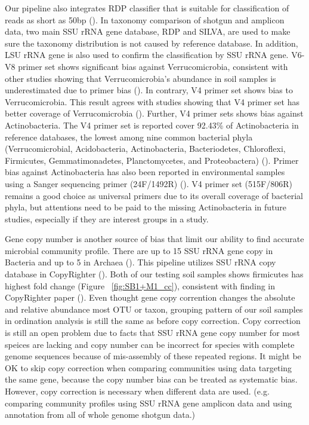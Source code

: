 \documentclass[12pt]{article}
\begin{document}
  Our pipeline also integrates RDP classifier that is suitable for classification of reads as short as 50bp (\cite{rdpclassifier}). In taxonomy comparison of shotgun and amplicon data, two main SSU rRNA gene database, RDP and SILVA, are used to make sure the taxonomy distribution is not caused by reference database. In addition, LSU rRNA gene is also used to confirm the classification by SSU rRNA gene. V6-V8 primer set shows significant bias against Verrucomicrobia, consistent with other studies showing that Verrucomicrobia’s abundance in soil samples is underestimated due to primer bias (\cite{verruco2011}). In contrary, V4 primer set shows bias to Verrucomicrobia. This result agrees with studies showing that V4 primer set has better coverage of Verrucomicrobia (\cite{verruco2011}). Further, V4 primer sets shows bias against Actinobacteria. The V4 primer set is reported cover 92.43\% of Actinobacteria in reference databases, the lowest among nine common bacterial phyla (Verrucomicrobial, Acidobacteria, Actinobacteria, Bacteriodetes, Chloroflexi, Firmicutes, Gemmatimonadetes, Planctomycetes, and Proteobactera) (\cite{verruco2011}). Primer bias against Actinobacteria has also been reported in environmental samples using a Sanger sequencing primer (24F/1492R) (\cite{actinobias}). V4 primer set (515F/806R) remains a good choice as universal primers due to its overall coverage of bacterial phyla, but attentions need to be paid to the missing Actinobacteria in future studies, especially if they are interest groups in a study.

  Gene copy number is another source of bias that limit our ability to find accurate microbial community profile. There are up to 15 SSU rRNA gene copy in Bacteria and up to 5 in Archaea (\cite{rrncopy2004}). This pipeline utilizes SSU rRNA copy database in CopyRighter (\cite{copyrighter}). Both of our testing soil samples shows firmicutes has highest fold change (Figure ~\ref{fig:SB1+M1_cc}), consistent with finding in CopyRighter paper (\cite{copyrighter}). Even thought gene copy corrention changes the absolute and relative abundance most OTU or taxon, grouping pattern of our soil samples in ordination analysis is still the same as before copy correction. Copy correction is still an open problem due to facts that SSU rRNA gene copy number for most speices are lacking and copy number can be incorrect for species with complete genome sequences because of mis-assembly of these repeated regions. It might be OK to skip copy correction when comparing communities using data targeting the same gene, because the copy number bias can be treated as systematic bias. However, copy correction is necessary when different data are used. (e.g. comparing community profiles using SSU rRNA gene amplicon data and using annotation from all of whole genome shotgun data.)
\end{document}
